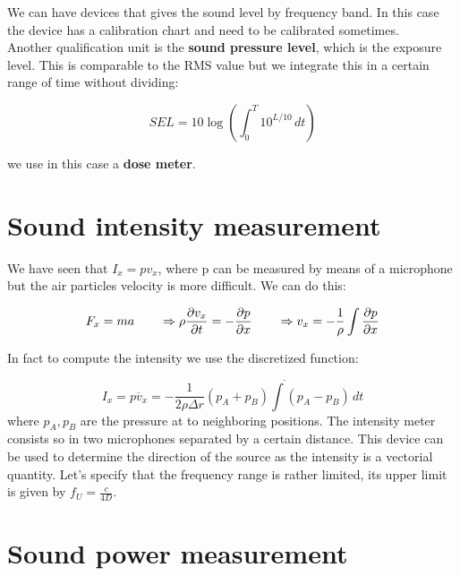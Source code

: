 	We can have devices that gives the sound level by frequency band. In this case the device has a calibration chart and need to be calibrated sometimes. \\
	
	Another qualification unit is the \textbf{sound pressure level}, which is the exposure level. This is comparable to the RMS value but we integrate this in a certain range of time without dividing: 
	
	\begin{equation}
	SEL = 10 \log \left( \int _0^T 10^{L/10}\, dt \right)
	\end{equation}
	
	we use in this case a \textbf{dose meter}. 
	
\section{Sound intensity measurement}	
	We have seen that $I_x = pv_x$, where p can be measured by means of a microphone but the air particles velocity is more difficult. We can do this:
	
	\begin{equation}
	F_x = ma \qquad \Rightarrow \rho \frac{\partial v_x}{\partial t} = - \frac{\partial p}{\partial x} \qquad \Rightarrow v_x = -\frac{1}{\rho} \int \frac{\partial p}{\partial x}
	\end{equation}
	
	In fact to compute the intensity we use the discretized function: 
	
	\begin{equation}
	I_x = \overline{pv_x} = -\frac{1}{2\rho\Delta r}\overline{(p_A + p_B)\int  (p_A - p_B)\, dt}
	\end{equation}
	where $p_A,p_B$ are the pressure at to neighboring positions. The intensity meter consists so in two microphones separated by a certain distance. This device can be used to determine the direction of the source as the intensity is a vectorial quantity.  Let's specify that the frequency range is rather limited, its upper limit is given by $f_U = \frac{c}{4D}$. 
	
\section{Sound power measurement}
